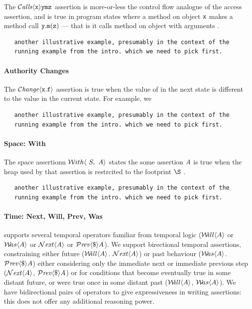 
The  ${\mathcal{C}}\textrm{\textit{alls}}\langle {\mbox{\tt{x}}}\rangle {{\mbox{\tt{y}}}} {{\mbox{\tt{m}}}} {{{\mbox{\tt{z}}}}}$
assertion is more-or-less the control flow analogue of
the access assertion, and is true 
in program states where a method on object 
${{\mbox{\tt{x}}}}$ makes a method call ${{\mbox{\tt{y}}}}.{{\mbox{\tt{m}}}}({{{\mbox{\tt{z}}}}})$ --- that is it calls method 
{\m} on object {\y} with arguments {\z}.


\begin{lstlisting}
   another illustrative example, presumably in the context of the
   running example from the intro. which we need to pick first.
\end{lstlisting}


\paragraph{Authority Changes}

The $\mathcal{C}\textrm{\textit{hange}}\langle{\mbox{\tt{x}}}.{\mbox{\tt{f}}}\rangle$  assertion is true when the value of 
in the next state is different to the value in the current state.
For example, we 

\begin{lstlisting}
   another illustrative example, presumably in the context of the
   running example from the intro. which we need to pick first.
\end{lstlisting}

\paragraph{Space: With}

The space assertionn ${\mathcal W}ith\langle\ S,\ A\rangle$ states the some assertion $A$ is
true when the heap used by that assertion is restrcited to the
footprint $\S$  
{}.

{}

\begin{lstlisting}
   another illustrative example, presumably in the context of the
   running example from the intro. which we need to pick first.
\end{lstlisting}


\paragraph{Time: Next, Will, Prev, Was}

\Chainmail supports several temporal operators familiar from temporal
logic (${{\mathcal W}\!ill}\langle A\rangle$ or ${{\mathcal W}\!as}\langle A\rangle$ or ${\mathcal{N}}\textrm{\textit{ext}}\langle A\rangle$ or ${\mathcal{P}}\textrm{\textit{rev}}\langle \$\rangle A$). 
We support birectional temporal
assertions, constraining either future (${{\mathcal W}\!ill}\langle A\rangle$. ${\mathcal{N}}\textrm{\textit{ext}}\langle A\rangle$)
or past behaviour (${{\mathcal W}\!as}\langle A\rangle$.  ${\mathcal{P}}\textrm{\textit{rev}}\langle \$\rangle A$) either considering only
the  immediate next or immediate previous step (${\mathcal{N}}\textrm{\textit{ext}}\langle A\rangle$,
${\mathcal{P}}\textrm{\textit{rev}}\langle \$\rangle A$) or for conditions that become eventually true in some
distant future, or were true once in some distant past  
(${{\mathcal W}\!ill}\langle A\rangle$, ${{\mathcal W}\!as}\langle A\rangle$). We have bidirectional pairs of operators
to give expressiveness in writing assertions: this does not offer any
additional reasoning power. 

